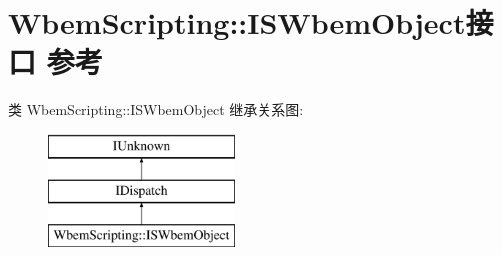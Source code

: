 \hypertarget{interface_wbem_scripting_1_1_i_s_wbem_object}{}\section{Wbem\+Scripting\+:\+:I\+S\+Wbem\+Object接口 参考}
\label{interface_wbem_scripting_1_1_i_s_wbem_object}
类 Wbem\+Scripting\+:\+:I\+S\+Wbem\+Object 继承关系图\+:\begin{figure}[H]
\begin{center}
\leavevmode
\includegraphics[height=3.000000cm]{interface_wbem_scripting_1_1_i_s_wbem_object}
\end{center}
\end{figure}
